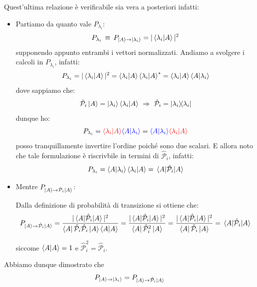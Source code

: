 \begin{myprf}
	
	Quest'ultima relazione è verificabile sia vera a posteriori infatti:

\begin{itemize}
	\item Partiamo da quanto vale $ P_{\lambda_i}$:
\begin{align*}
	 P_{\lambda_i} \, \equiv \, P_{\ket{A} \to \ket{\lambda_i}} = |\braket{\lambda_i}{A}|^2
\end{align*}
	supponendo appunto entrambi i vettori normalizzati. Andiamo a svolgere i calcoli in $ P_{\lambda_i}$, infatti:
\begin{align*}
	P_{\lambda_i} =  |\braket{\lambda_i}{A}|^2 = \braket{\lambda_i}{A} \braket{\lambda_i}{A}^* = \braket{\lambda_i}{A} \braket{A}{\lambda_i}
\end{align*}
	dove sappiamo che:
\begin{align*}
	\hat{\mathcal{P}}_i \ket{A} = \ket{\lambda_i} \braket{\lambda_i}{A} \,\, \Rightarrow \,\, \hat{\mathcal{P}}_i = \ketbra{\lambda_i}
\end{align*}
	dunque ho:
\begin{align*}
	P_{\lambda_i} = \textcolor{red}{\braket{\lambda_i}{A}} \textcolor{blue}{\braket{A}{\lambda_i} }= \textcolor{blue}{\braket{A}{\lambda_i} } \textcolor{red}{\braket{\lambda_i}{A}} 
\end{align*}
	posso tranquillamente invertire l'ordine poiché sono due scalari. E allora noto che tale formulazione è riscrivbile in termini di $\hat{\mathcal{P}}_i$, infatti:
\begin{align*}
	P_{\lambda_i} = \braket{A}{\lambda_i}\braket{\lambda_i}{A} = \mel{A}{\hat{\mathcal{P}}_i}{A}
\end{align*}

	\item Mentre $P_{\ket{A} \to \hat{\mathcal{P}}_i \ket{A}} $:
	
		Dalla definizione di probabilità di transizione si ottiene che:
\begin{align*}
	P_{\ket{A} \to \hat{\mathcal{P}}_i \ket{A}}  = \frac{|\mel{A}{\hat{\mathcal{P}}_i}{A}|^2}{\bra{A}\hat{\mathcal{P}}_i \hat{\mathcal{P}}_i\ket{A} \braket{A}} = \frac{|\mel{A}{\hat{\mathcal{P}}_i}{A}|^2}{\bra{A}\hat{\mathcal{P}}^2_i\ket{A}} =  \frac{|\mel{A}{\hat{\mathcal{P}}_i}{A}|^2}{\bra{A}\hat{\mathcal{P}}_i\ket{A}}  = \mel{A}{\hat{\mathcal{P}}_i}{A}
\end{align*}
	
	siccome $\braket{A} = 1$ e $\hat{\mathcal{P}}_i^2 = \hat{\mathcal{P}}_i$.

\end{itemize}

	Abbiamo dunque dimostrato che 
\begin{align*}
	P_{\ket{A} \to \ket{\lambda_i}}  = P_{\ket{A} \to \hat{\mathcal{P}}_i \ket{A}} 
\end{align*}
\end{myprf}

